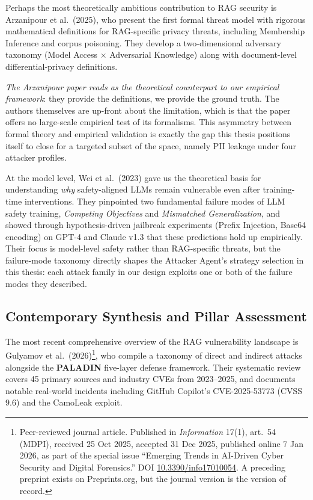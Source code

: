 \documentclass[11pt,a4paper]{report}
\begin{document}
Perhaps the most theoretically ambitious contribution to RAG security is Arzanipour et al.\ (2025), who present the first formal threat model with rigorous mathematical definitions for RAG-specific privacy threats, including Membership Inference and corpus poisoning. They develop a two-dimensional adversary taxonomy (Model Access $\times$ Adversarial Knowledge) along with document-level differential-privacy definitions.

\begin{critbox}
\textit{The Arzanipour paper reads as the theoretical counterpart to our empirical framework}: they provide the definitions, we provide the ground truth. The authors themselves are up-front about the limitation, which is that the paper offers no large-scale empirical test of its formalisms. This asymmetry between formal theory and empirical validation is exactly the gap this thesis positions itself to close for a targeted subset of the space, namely PII leakage under four attacker profiles.
\end{critbox}

At the model level, Wei et al.\ (2023) gave us the theoretical basis for understanding \emph{why} safety-aligned LLMs remain vulnerable even after training-time interventions. They pinpointed two fundamental failure modes of LLM safety training, \emph{Competing Objectives} and \emph{Mismatched Generalization}, and showed through hypothesis-driven jailbreak experiments (Prefix Injection, Base64 encoding) on GPT-4 and Claude v1.3 that these predictions hold up empirically. Their focus is model-level safety rather than RAG-specific threats, but the failure-mode taxonomy directly shapes the Attacker Agent's strategy selection in this thesis: each attack family in our design exploits one or both of the failure modes they described.

\subsection{Contemporary Synthesis and Pillar Assessment}

The most recent comprehensive overview of the RAG vulnerability landscape is Gulyamov et al.\ (2026)\footnote{Peer-reviewed journal article. Published in \emph{Information} 17(1), art.~54 (MDPI), received 25 Oct 2025, accepted 31 Dec 2025, published online 7 Jan 2026, as part of the special issue ``Emerging Trends in AI-Driven Cyber Security and Digital Forensics.'' DOI \href{https://doi.org/10.3390/info17010054}{10.3390/info17010054}. A preceding preprint exists on Preprints.org, but the journal version is the version of record.}, who compile a taxonomy of direct and indirect attacks alongside the \textbf{PALADIN} five-layer defense framework. Their systematic review covers 45 primary sources and industry CVEs from 2023--2025, and documents notable real-world incidents including GitHub Copilot's CVE-2025-53773 (CVSS 9.6) and the CamoLeak exploit.
\end{document}
